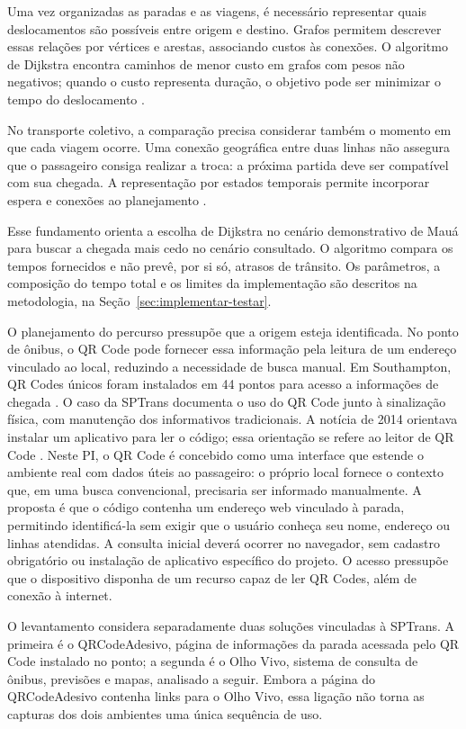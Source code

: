 \documentclass[12pt,oneside,a4paper,brazil,chapter=TITLE]{abntex2}
\begin{document}
Uma vez organizadas as paradas e as viagens, é necessário representar quais deslocamentos são possíveis entre origem e destino. Grafos permitem descrever essas relações por vértices e arestas, associando custos às conexões. O algoritmo de Dijkstra encontra caminhos de menor custo em grafos com pesos não negativos; quando o custo representa duração, o objetivo pode ser minimizar o tempo do deslocamento \citep{sedgewicksp}.

No transporte coletivo, a comparação precisa considerar também o momento em que cada viagem ocorre. Uma conexão geográfica entre duas linhas não assegura que o passageiro consiga realizar a troca: a próxima partida deve ser compatível com sua chegada. A representação por estados temporais permite incorporar espera e conexões ao planejamento \citep{transitplanner}.

Esse fundamento orienta a escolha de Dijkstra no cenário demonstrativo de Mauá para buscar a chegada mais cedo no cenário consultado. O algoritmo compara os tempos fornecidos e não prevê, por si só, atrasos de trânsito. Os parâmetros, a composição do tempo total e os limites da implementação são descritos na metodologia, na Seção~\ref{sec:implementar-testar}.

O planejamento do percurso pressupõe que a origem esteja identificada. No ponto de ônibus, o QR Code pode fornecer essa informação pela leitura de um endereço vinculado ao local, reduzindo a necessidade de busca manual. Em Southampton, QR Codes únicos foram instalados em 44 pontos para acesso a informações de chegada \citep{southampton}. O caso da SPTrans documenta o uso do QR Code junto à sinalização física, com manutenção dos informativos tradicionais. A notícia de 2014 orientava instalar um aplicativo para ler o código; essa orientação se refere ao leitor de QR Code \citep{qrsptrans2014}. Neste PI, o QR Code é concebido como uma interface que estende o ambiente real com dados úteis ao passageiro: o próprio local fornece o contexto que, em uma busca convencional, precisaria ser informado manualmente. A proposta é que o código contenha um endereço web vinculado à parada, permitindo identificá-la sem exigir que o usuário conheça seu nome, endereço ou linhas atendidas. A consulta inicial deverá ocorrer no navegador, sem cadastro obrigatório ou instalação de aplicativo específico do projeto. O acesso pressupõe que o dispositivo disponha de um recurso capaz de ler QR Codes, além de conexão à internet.

\clearpage
\label{sec:analise-qrcodeadesivo}
O levantamento considera separadamente duas soluções vinculadas à SPTrans. A primeira é o QRCodeAdesivo, página de informações da parada acessada pelo QR Code instalado no ponto; a segunda é o Olho Vivo, sistema de consulta de ônibus, previsões e mapas, analisado a seguir. Embora a página do QRCodeAdesivo contenha links para o Olho Vivo, essa ligação não torna as capturas dos dois ambientes uma única sequência de uso.
\end{document}
